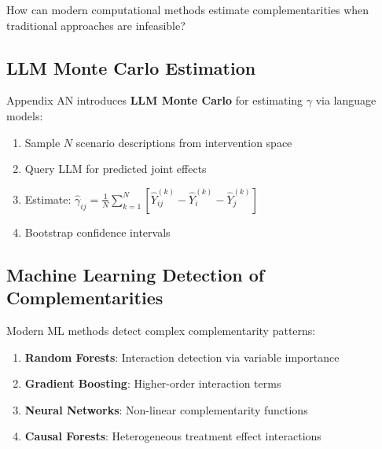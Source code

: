 \begin{tcolorbox}[colback=cyan!5!white,colframe=cyan!75!black,title=\textbf{Fundamental Question}]
How can modern computational methods estimate complementarities when traditional approaches are infeasible?
\end{tcolorbox}

\subsection{LLM Monte Carlo Estimation}
\label{subsec:llm-monte-carlo}

Appendix AN introduces \textbf{LLM Monte Carlo} for estimating $\gamma$ via language models:

\begin{definition}
\begin{enumerate}
    \item Sample $N$ scenario descriptions from intervention space
    \item Query LLM for predicted joint effects
    \item Estimate: $\hat{\gamma}_{ij} = \frac{1}{N} \sum_{k=1}^{N} [\hat{Y}_{ij}^{(k)} - \hat{Y}_i^{(k)} - \hat{Y}_j^{(k)}]$
    \item Bootstrap confidence intervals
\end{enumerate}
\end{definition}

\subsection{Machine Learning Detection of Complementarities}
\label{subsec:ml-detection}

Modern ML methods detect complex complementarity patterns:

\begin{enumerate}
    \item \textbf{Random Forests}: Interaction detection via variable importance
    \item \textbf{Gradient Boosting}: Higher-order interaction terms
    \item \textbf{Neural Networks}: Non-linear complementarity functions
    \item \textbf{Causal Forests}: Heterogeneous treatment effect interactions
\end{enumerate}

